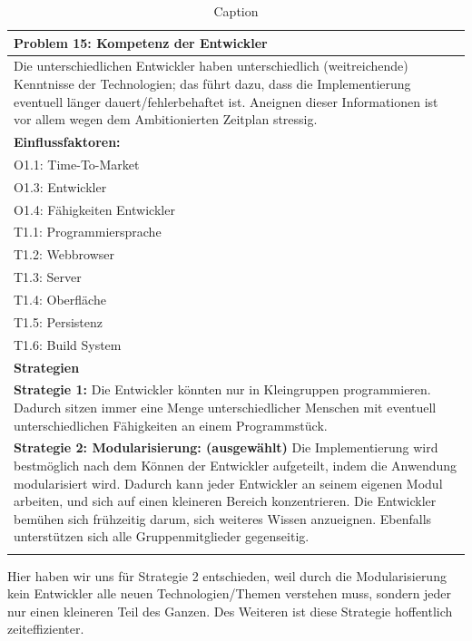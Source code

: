 \documentclass[enabledeprecatedfontcommands,fontsize=12pt,paper=a4,twoside]{scrartcl}
\begin{document}
\begin{table}[H]
    \centering
    \begin{tabular}{|p{15cm}|}
    \hline
          \textbf{Problem 15:} Kompetenz der Entwickler
          \\ \hline
          Die unterschiedlichen Entwickler haben unterschiedlich (weitreichende) Kenntnisse der Technologien; das führt dazu, dass die Implementierung eventuell länger dauert/fehlerbehaftet ist. Aneignen dieser Informationen ist vor allem wegen dem Ambitionierten Zeitplan stressig.
          \\ \hline
          \textbf{Einflussfaktoren: } \\
          O1.1: Time-To-Market \\
          O1.3: Entwickler \\
          O1.4: Fähigkeiten Entwickler \\
          T1.1: Programmiersprache \\
          T1.2: Webbrowser \\
          T1.3: Server \\
          T1.4: Oberfläche \\
          T1.5: Persistenz \\
          T1.6: Build System\\
          \hline
          \textbf{Strategien} \\ \hline
          \textbf{Strategie 1:} Die Entwickler könnten nur in Kleingruppen programmieren. Dadurch sitzen immer eine Menge unterschiedlicher Menschen mit eventuell unterschiedlichen Fähigkeiten an einem Programmstück. \\
          \textbf{Strategie 2: Modularisierung: (ausgewählt)} Die Implementierung wird bestmöglich nach dem Können der Entwickler aufgeteilt, indem die Anwendung modularisiert wird. Dadurch kann jeder Entwickler an seinem eigenen Modul arbeiten, und sich auf einen kleineren Bereich konzentrieren. Die Entwickler bemühen sich frühzeitig darum, sich weiteres Wissen anzueignen. Ebenfalls unterstützen sich alle Gruppenmitglieder gegenseitig.\\
          \\ \hline
    \end{tabular}
    \caption{Caption}
    \label{tab:my_label}
\end{table}
Hier haben wir uns für Strategie 2 entschieden, weil durch die Modularisierung kein Entwickler alle neuen Technologien/Themen verstehen muss, sondern jeder nur einen kleineren Teil des Ganzen. Des Weiteren ist diese Strategie hoffentlich zeiteffizienter. \\
\end{document}
